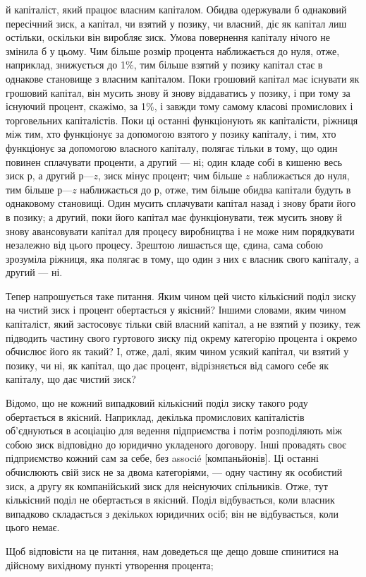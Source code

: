 \parcont{}  %
й капіталіст, який працює власним капіталом. Обидва одержували
б однаковий пересічний зиск, а капітал, чи взятий у позику,
чи власний, діє як капітал лиш остільки, оскільки він
виробляє зиск. Умова повернення капіталу нічого не змінила б
у цьому. Чим більше розмір процента наближається до нуля,
отже, наприклад, знижується до 1\%, тим більше взятий у позику
капітал стає в однакове становище з власним капіталом.
Поки грошовий капітал має існувати як грошовий капітал,
він мусить знову й знову віддаватись у позику, і при тому
за існуючий процент, скажімо, за 1\%, і завжди тому самому
класові промислових і торговельних капіталістів. Поки ці останні
функціонують як капіталісти, ріжниця між тим, хто функціонує
за допомогою взятого у позику капіталу, і тим, хто функціонує за
допомогою власного капіталу, полягає тільки в тому, що один
повинен сплачувати проценти, а другий — ні; один кладе собі в
кишеню весь зиск $р$, а другий $р — z$, зиск мінус процент; чим
більше $z$ наближається до нуля, тим більше $р — z$ наближається
до $р$, отже, тим більше обидва капітали будуть в однаковому
становищі. Один мусить сплачувати капітал назад і знову брати
його в позику; а другий, поки його капітал має функціонувати,
теж мусить знову й знову авансовувати капітал для процесу
виробництва і не може ним порядкувати незалежно від цього
процесу. Зрештою лишається ще, єдина, сама собою зрозуміла
ріжниця, яка полягає в тому, що один з них є власник свого капіталу,
а другий — ні.

Тепер напрошується таке питання. Яким чином цей чисто
кількісний поділ зиску на чистий зиск і процент обертається
у якісний? Іншими словами, яким чином капіталіст, який застосовує
тільки свій власний капітал, а не взятий у позику, теж
підводить частину свого гуртового зиску під окрему категорію
процента і окремо обчислює його як такий? І, отже, далі, яким
чином усякий капітал, чи взятий у позику, чи ні, як капітал,
що дає процент, відрізняється від самого себе як капіталу, що
дає чистий зиск?

Відомо, що не кожний випадковий кількісний поділ зиску
такого роду обертається в якісний. Наприклад, декілька промислових
капіталістів об’єднуються в асоціацію для ведення підприємства
і потім розподіляють між собою зиск відповідно до
юридично укладеного договору. Інші провадять своє підприємство
кожний сам за себе, без associé [компаньйонів]. Ці останні
обчислюють свій зиск не за двома категоріями, — одну частину
як особистий зиск, а другу як компанійський зиск для неіснуючих
спільників. Отже, тут кількісний поділ не обертається
в якісний. Поділ відбувається, коли власник випадково складається
з декількох юридичних осіб; він не відбувається, коли
цього немає.

Щоб відповісти на це питання, нам доведеться ще дещо довше
спинитися на дійсному вихідному пункті утворення процента;
\parbreak{}  %
